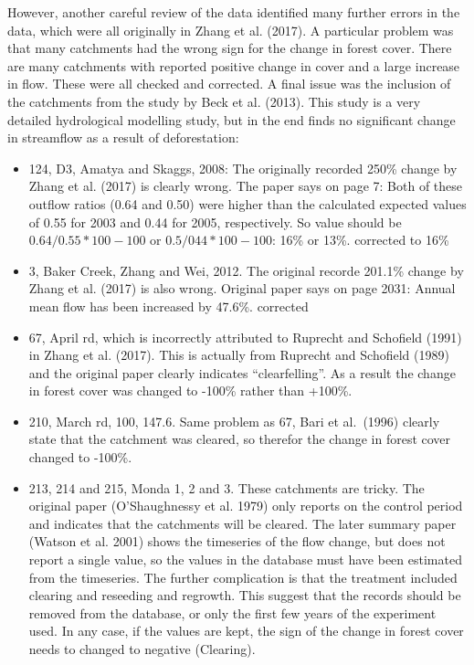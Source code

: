 \documentclass[]{elsarticle} %
\providecommand{\tightlist}{%
  \setlength{\itemsep}{0pt}\setlength{\parskip}{0pt}}
\begin{document}
However, another careful review of the data identified many further errors in the data, which were all originally in Zhang et al. (2017). A particular problem was that many catchments had the wrong sign for the change in forest cover. There are many catchments with reported positive change in cover and a large increase in flow. These were all checked and corrected. A final issue was the inclusion of the catchments from the study by Beck et al. (2013). This study is a very detailed hydrological modelling study, but in the end finds no significant change in streamflow as a result of deforestation:

\begin{itemize}
\tightlist
\item
  124, D3, Amatya and Skaggs, 2008: The originally recorded 250\% change by Zhang et al. (2017) is clearly wrong. The paper says on page 7: Both of these outflow ratios (0.64 and 0.50) were higher than the calculated expected values of 0.55 for 2003 and 0.44 for 2005, respectively. So value should be \(0.64/0.55*100 - 100\) or \(0.5/044*100 - 100\): 16\% or 13\%. corrected to 16\%
\item
  3, Baker Creek, Zhang and Wei, 2012. The original recorde 201.1\% change by Zhang et al. (2017) is also wrong. Original paper says on page 2031: Annual mean flow has been increased by 47.6\%. corrected\\
\item
  67, April rd, which is incorrectly attributed to Ruprecht and Schofield (1991) in Zhang et al. (2017). This is actually from Ruprecht and Schofield (1989) and the original paper clearly indicates ``clearfelling''. As a result the change in forest cover was changed to -100\% rather than +100\%.\\
\item
  210, March rd, 100, 147.6. Same problem as 67, Bari et al.~(1996) clearly state that the catchment was cleared, so therefor the change in forest cover changed to -100\%.\\
\item
  213, 214 and 215, Monda 1, 2 and 3. These catchments are tricky. The original paper (O'Shaughnessy et al. 1979) only reports on the control period and indicates that the catchments will be cleared. The later summary paper (Watson et al. 2001) shows the timeseries of the flow change, but does not report a single value, so the values in the database must have been estimated from the timeseries. The further complication is that the treatment included clearing and reseeding and regrowth. This suggest that the records should be removed from the database, or only the first few years of the experiment used. In any case, if the values are kept, the sign of the change in forest cover needs to changed to negative (Clearing).\\

\end{itemize}
\end{document}
